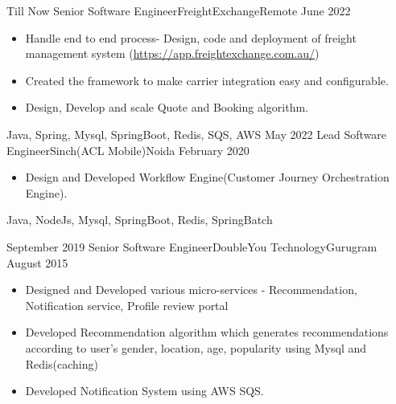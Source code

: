 %
%
%
\begin{experiences}
\emptySeparator
\experience
    {Till Now}     {Senior Software Engineer}{FreightExchange}{Remote}
    {June 2022}    {
                      \begin{itemize}
                        \item Handle end to end process- Design, code and deployment of freight management system (\url{https://app.freightexchange.com.au/})
                        \item Created the framework to make carrier integration easy and configurable.
                        \item Design, Develop and scale Quote and Booking algorithm.
                      \end{itemize}
                    }
                    {Java, Spring, Mysql, SpringBoot, Redis, SQS, AWS}
\experience
    {May 2022}     {Lead Software Engineer}{Sinch(ACL Mobile)}{Noida}
    {February 2020}    {
                      \begin{itemize}
                        \item Design and Developed Workflow Engine(Customer Journey Orchestration Engine).
                      \end{itemize}
                    }
                    {Java, NodeJs, Mysql, SpringBoot, Redis, SpringBatch}
\emptySeparator

\experience
    {September 2019} {Senior Software Engineer}{DoubleYou Technology}{Gurugram}
    {August 2015}    {
                      \begin{itemize}
                        \item Designed and Developed various micro-services - Recommendation, Notification service, Profile review portal
                        \item Developed Recommendation algorithm which generates recommendations according to user’s gender, location, age, popularity using Mysql and Redis(caching)                      
                        \item Developed Notification System using AWS SQS.
                                                

\end{itemize}}
\end{experiences}
